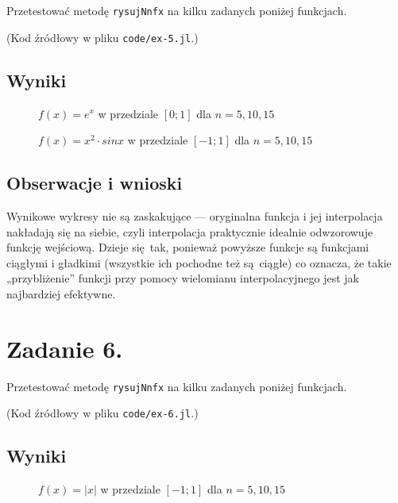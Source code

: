 \documentclass[10pt]{article}
\begin{document}
{Przetestować metodę \texttt{rysujNnfx} na kilku zadanych poniżej funkcjach.

(Kod źródłowy w pliku \texttt{code/ex-5.jl}.)

\subsection{Wyniki}

\begin{figure}[H]
    \centering
    \scalebox{0.5}{}
    \scalebox{0.5}{}
    \scalebox{0.5}{}
    \caption{$f(x) = e^x$ w przedziale $[0;1]$ dla $n = 5,10,15$}
\end{figure}

\begin{figure}[H]
    \centering
    \scalebox{0.5}{}
    \scalebox{0.5}{}
    \scalebox{0.5}{}
    \caption{$f(x) = x^2 \cdot sin x$ w przedziale $[-1;1]$ dla $n = 5,10,15$}
\end{figure}

\subsection{Obserwacje i wnioski}

Wynikowe wykresy nie są zaskakujące — oryginalna funkcja i jej interpolacja nakładają się na siebie, czyli interpolacja praktycznie idealnie odwzorowuje funkcję wejściową. Dzieje się tak, ponieważ powyższe funkcje są funkcjami ciągłymi i gładkimi (wszystkie ich pochodne też są ciągłe) co oznacza, że takie „przybliżenie” funkcji przy pomocy wielomianu interpolacyjnego jest jak najbardziej efektywne.


\section{Zadanie 6.}

Przetestować metodę \texttt{rysujNnfx} na kilku zadanych poniżej funkcjach.

(Kod źródłowy w pliku \texttt{code/ex-6.jl}.)

\subsection{Wyniki}

\begin{figure}[H]
    \centering
    \scalebox{0.5}{}
    \scalebox{0.5}{}
    \scalebox{0.5}{}
    \caption{$f(x) = |x|$ w przedziale $[-1;1]$ dla $n = 5,10,15$}
\end{figure}

}
\end{document}
